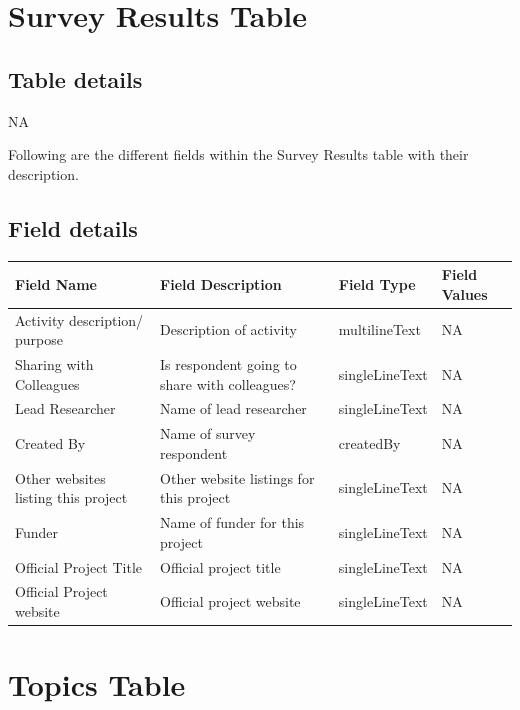 \documentclass[
]{book}
\begin{document}
\hypertarget{survey-results-table}{%
\section{Survey Results Table}\label{survey-results-table}}

\hypertarget{table-details-7}{%
\subsection{Table details}\label{table-details-7}}

NA

Following are the different fields within the Survey Results table with their description.

\hypertarget{field-details-5}{%
\subsection{Field details}\label{field-details-5}}

\begin{table}
\centering
\begin{tabular}{l|l|l|l}
\hline
\textbf{Field Name} & \textbf{Field Description} & \textbf{Field Type} & \textbf{Field Values}\\
\hline
Activity description/ purpose & Description of activity & multilineText & NA\\
\hline
Sharing with Colleagues & Is respondent going to share with colleagues? & singleLineText & NA\\
\hline
Lead Researcher & Name of lead researcher & singleLineText & NA\\
\hline
Created By & Name of survey respondent & createdBy & NA\\
\hline
Other websites listing this project & Other website listings for this project & singleLineText & NA\\
\hline
Funder & Name of funder for this project & singleLineText & NA\\
\hline
Official Project Title & Official project title & singleLineText & NA\\
\hline
Official Project website & Official project website & singleLineText & NA\\
\hline
\end{tabular}
\end{table}

\hypertarget{topics-table}{%
\section{Topics Table}\label{topics-table}}
\end{document}
